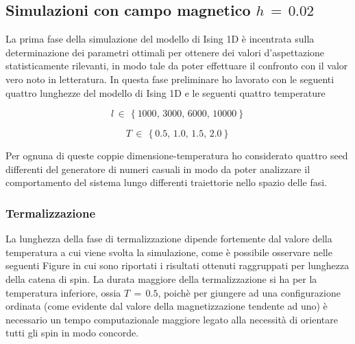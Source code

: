 \subsection{Simulazioni con campo magnetico $h\,=\,0.02$}

La prima fase della simulazione del modello di Ising 1D è incentrata sulla determinazione dei parametri ottimali per ottenere 
dei valori d'aspettazione statisticamente rilevanti, in modo tale da poter effettuare il confronto con il valor vero noto in letteratura. In 
questa fase preliminare ho lavorato con le seguenti quattro lunghezze del modello di Ising 1D e le seguenti quattro temperature 

\begin{equation}
    l\,\in\,\left\{1000,\,3000,\,6000,\,10000\right\}
    \label{eq: dim_sim_Ising1D}
\end{equation}

\begin{equation}
    T\,\in\,\left\{0.5,\,1.0,\,1.5,\,2.0\right\}
    \label{eq: temp_sim_Ising1D}
\end{equation}

Per ognuna di queste coppie dimensione-temperatura ho considerato quattro seed differenti del generatore di numeri casuali in modo da 
poter analizzare il comportamento del sistema lungo differenti traiettorie nello spazio delle fasi. 



\subsubsection{Termalizzazione}

La lunghezza della fase di termalizzazione dipende fortemente dal valore della temperatura a cui viene svolta la simulazione, come è 
possibile osservare nelle seguenti Figure in cui sono riportati i risultati ottenuti raggruppati per lunghezza della catena di spin. 
La durata maggiore della termalizzazione si ha per la temperatura inferiore, ossia $T\,=\,0.5$, poichè per giungere ad una configurazione 
ordinata (come evidente dal valore della magnetizzazione tendente ad uno) è necessario un tempo computazionale maggiore legato alla 
necessità di orientare tutti gli spin in modo concorde.

\newpage

\vspace*{\fill}

